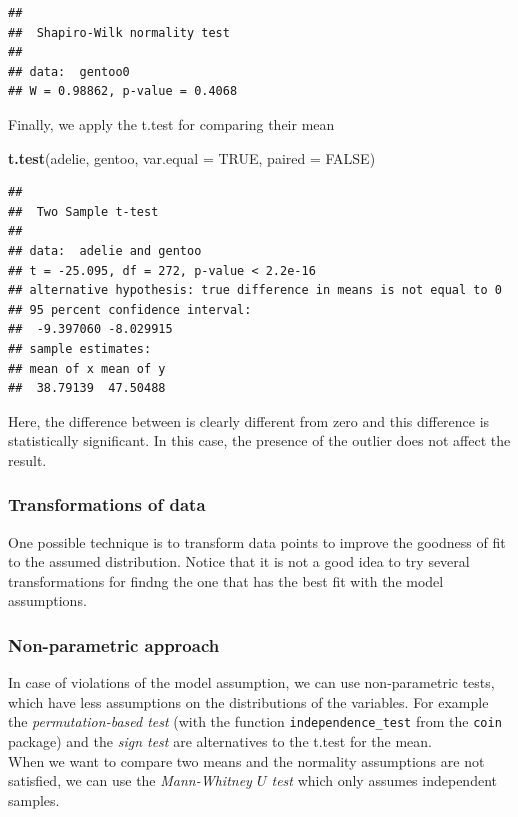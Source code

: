 \documentclass[
]{article}
\newenvironment{Shaded}{\begin{snugshade}}{\end{snugshade}}
\newcommand{\AttributeTok}[1]{\textcolor[rgb]{0.13,0.29,0.53}{#1}}
\newcommand{\ConstantTok}[1]{\textcolor[rgb]{0.56,0.35,0.01}{#1}}
\newcommand{\FunctionTok}[1]{\textcolor[rgb]{0.13,0.29,0.53}{\textbf{#1}}}
\newcommand{\NormalTok}[1]{#1}
\begin{document}
\begin{verbatim}
## 
##  Shapiro-Wilk normality test
## 
## data:  gentoo0
## W = 0.98862, p-value = 0.4068
\end{verbatim}

Finally, we apply the t.test for comparing their mean

\begin{Shaded}
\begin{Highlighting}[]
\FunctionTok{t.test}\NormalTok{(adelie, gentoo, }\AttributeTok{var.equal =} \ConstantTok{TRUE}\NormalTok{, }\AttributeTok{paired =} \ConstantTok{FALSE}\NormalTok{)}
\end{Highlighting}
\end{Shaded}

\begin{verbatim}
## 
##  Two Sample t-test
## 
## data:  adelie and gentoo
## t = -25.095, df = 272, p-value < 2.2e-16
## alternative hypothesis: true difference in means is not equal to 0
## 95 percent confidence interval:
##  -9.397060 -8.029915
## sample estimates:
## mean of x mean of y 
##  38.79139  47.50488
\end{verbatim}

Here, the difference between is clearly different from zero and this
difference is statistically significant. In this case, the presence of
the outlier does not affect the result.

\hypertarget{transformations-of-data}{%
\subsubsection{Transformations of data}\label{transformations-of-data}}

One possible technique is to transform data points to improve the
goodness of fit to the assumed distribution. Notice that it is not a
good idea to try several transformations for findng the one that has the
best fit with the model assumptions.

\hypertarget{non-parametric-approach}{%
\subsubsection{Non-parametric approach}\label{non-parametric-approach}}

In case of violations of the model assumption, we can use non-parametric
tests, which have less assumptions on the distributions of the
variables. For example the \emph{permutation-based test} (with the
function \texttt{independence\_test} from the \texttt{coin} package) and
the \emph{sign test} are alternatives to the t.test for the mean.\\
When we want to compare two means and the normality assumptions are not
satisfied, we can use the \emph{Mann-Whitney \(U\) test} which only
assumes independent samples.
\end{document}

